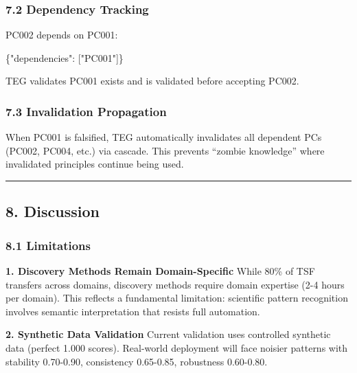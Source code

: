 \documentclass[
]{article}
\newenvironment{Shaded}{}{}
\newcommand{\DataTypeTok}[1]{\textcolor[rgb]{0.56,0.13,0.00}{#1}}
\newcommand{\FunctionTok}[1]{\textcolor[rgb]{0.02,0.16,0.49}{#1}}
\newcommand{\OtherTok}[1]{\textcolor[rgb]{0.00,0.44,0.13}{#1}}
\newcommand{\StringTok}[1]{\textcolor[rgb]{0.25,0.44,0.63}{#1}}
\begin{document}
\subsubsection{7.2 Dependency Tracking}\label{dependency-tracking}

PC002 depends on PC001:

\begin{Shaded}
\begin{Highlighting}[]
\FunctionTok{\{}\DataTypeTok{"dependencies"}\FunctionTok{:} \OtherTok{[}\StringTok{"PC001"}\OtherTok{]}\FunctionTok{\}}
\end{Highlighting}
\end{Shaded}

TEG validates PC001 exists and is validated before accepting PC002.

\subsubsection{7.3 Invalidation
Propagation}\label{invalidation-propagation}

When PC001 is falsified, TEG automatically invalidates all dependent PCs
(PC002, PC004, etc.) via cascade. This prevents ``zombie knowledge''
where invalidated principles continue being used.

\begin{center}\rule{0.5\linewidth}{0.5pt}\end{center}

\subsection{8. Discussion}\label{discussion}

\subsubsection{8.1 Limitations}\label{limitations}

\textbf{1. Discovery Methods Remain Domain-Specific} While 80\% of TSF
transfers across domains, discovery methods require domain expertise
(2-4 hours per domain). This reflects a fundamental limitation:
scientific pattern recognition involves semantic interpretation that
resists full automation.

\textbf{2. Synthetic Data Validation} Current validation uses controlled
synthetic data (perfect 1.000 scores). Real-world deployment will face
noisier patterns with stability 0.70-0.90, consistency 0.65-0.85,
robustness 0.60-0.80.
\end{document}
